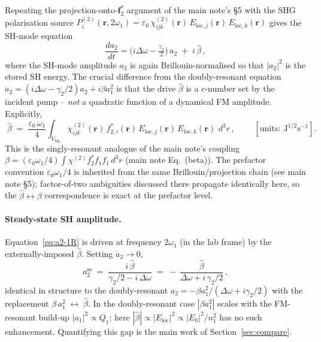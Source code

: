\documentclass[11pt,a4paper]{article}
\newcommand{\eps}{\varepsilon}
\newcommand{\bvec}[1]{\mathbf{#1}}
\newcommand{\f}{\bvec{f}}
\newcommand{\ri}{\bvec{r}}
\newcommand{\dthreer}{\,d^{3}r}
\newcommand{\chitwo}{\chi^{(2)}}
\newcommand{\Dom}{\Delta\omega}
\newcommand{\VNL}{V_{\text{NL}}}
\begin{document}
Repeating the projection-onto-$\f_2^{*}$ argument of the main note's \S 5
with the SHG polarisation source
$P_i^{(2)}(\ri,2\omega_1)=\eps_0\,\chitwo_{ijk}(\ri)\,E_{\text{loc},j}(\ri)\,E_{\text{loc},k}(\ri)$
gives the SH-mode equation
\begin{equation}
  \boxed{\;\frac{da_2}{dt}=\bigl(i\Dom-\tfrac{\gamma_2}{2}\bigr)\,a_2
                          \;+\;i\,\hat\beta\,,\;}
  \label{eq:a2-1R}
\end{equation}
where the SH-mode amplitude $a_2$ is again Brillouin-normalised so that
$|a_2|^{2}$ is the stored SH energy.  The crucial difference from the
doubly-resonant equation $\dot a_2=(i\Dom-\gamma_2/2)a_2+i\beta a_1^{2}$ is
that the drive $\hat\beta$ is a c-number set by the incident pump --
\emph{not} a quadratic function of a dynamical FM amplitude.  Explicitly,
\begin{equation}
  \boxed{\;\hat\beta\;=\;\frac{\eps_0\,\omega_1}{4}\!\int_{\VNL}\!
                \chitwo_{ijk}(\ri)\,f_{2,i}^{*}(\ri)\,
                E_{\text{loc},j}(\ri)\,E_{\text{loc},k}(\ri)\,\dthreer\,,\;}
  \qquad [\text{units}:\ \mathrm{J}^{1/2}\mathrm{s}^{-1}].
  \label{eq:betahat}
\end{equation}
This is the singly-resonant analogue of the main note's coupling
$\beta=(\eps_0\omega_1/4)\!\int\chitwo f_2^{*}f_1 f_1\dthreer$
(main note Eq.~(beta)).  The prefactor convention $\eps_0\omega_1/4$ is
inherited from the same Brillouin/projection chain (see main note \S 5);
factor-of-two ambiguities discussed there propagate identically here, so
the $\hat\beta\leftrightarrow\beta$ correspondence is exact at the
prefactor level.

\paragraph{Steady-state SH amplitude.}
Equation~\eqref{eq:a2-1R} is driven at frequency $2\omega_1$ (in the lab
frame) by the externally-imposed $\hat\beta$.  Setting $\dot a_2\to 0$,
\begin{equation}
  a_2^{\text{ss}}\;=\;\frac{i\,\hat\beta}{\gamma_2/2-i\,\Dom}
              \;=\;-\,\frac{\hat\beta}{\Dom+i\,\gamma_2/2}\,,
  \label{eq:a2ss-1R}
\end{equation}
identical in structure to the doubly-resonant
$a_2=-\beta a_1^{2}/(\Dom+i\gamma_2/2)$ with the replacement
$\beta\,a_1^{2}\;\longleftrightarrow\;\hat\beta$.  In the doubly-resonant
case $|\beta a_1^{2}|$ scales with the FM-resonant build-up
$|a_1|^{2}\propto Q_1$; here $|\hat\beta|\propto|E_\text{loc}|^{2}\propto
|E_0|^{2}/n_1^{2}$ has no such enhancement.  Quantifying this gap is the
main work of Section~\ref{sec:compare}.
\end{document}
